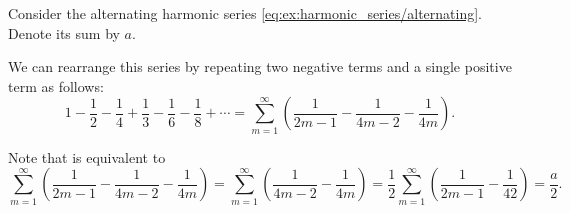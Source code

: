 \begin{example}\label{ex:riemanns_series_permutation_theorem/alternating_harmonic_series}
  Consider the alternating harmonic series \eqref{eq:ex:harmonic_series/alternating}. Denote its sum by \( a \).

  We can rearrange this series by repeating two negative terms and a single positive term as follows:
  \begin{equation}\label{ex:riemanns_series_permutation_theorem/alternating_harmonic_series/rearranged}
    1 - \frac 1 2 - \frac 1 4 + \frac 1 3 - \frac 1 6 - \frac 1 8 + \cdots
    =
    \sum_{m=1}^\infty \left( \frac 1 {2m - 1} - \frac 1 {4m - 2} - \frac 1 {4m} \right).
  \end{equation}

  Note that  is equivalent to
  \begin{equation*}
    \sum_{m=1}^\infty \left( \frac 1 {2m - 1} - \frac 1 {4m - 2} - \frac 1 {4m} \right)
    =
    \sum_{m=1}^\infty \left( \frac 1 {4m - 2} - \frac 1 {4m} \right)
    =
    \frac 1 2 \sum_{m=1}^\infty \left( \frac 1 {2m - 1} - \frac 1 {42} \right)
    =
    \frac a 2.
  \end{equation*}
\end{example}


